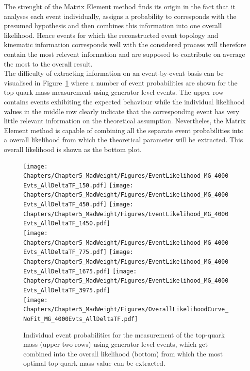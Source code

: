 The strenght of the Matrix Element method finds its origin in the fact that it analyses each event individually, assigns a probability to corresponds with the presumed hypothesis and then combines this information into one overall likelihood.
Hence events for which the reconstructed event topology and kinematic information corresponds well with the considered process will therefore contain the most relevent information and are supposed to contribute on average the most to the overall result.
\\
The difficulty of extracting information on an event-by-event basis can be visualised in Figure~\ref{fig::EvtProbsMTGen} where a number of event probabilities are shown for the top-quark mass measurement using generator-level events. The upper row contains events exhibiting the expected behaviour while the individual likelihood values in the middle row clearly indicate that the corresponding event has very little relevant information on the theoretical assumption.
Nevertheles, the Matrix Element method is capable of combining all the separate event probabilities into a overall likelihood from which the theoretical parameter will be extracted. This overall likelihood is shown as the bottom plot. %
\\
\begin{figure}[h!tb]
 \centering
 \texttt{[image: Chapters/Chapter5\_MadWeight/Figures/EventLikelihood\_MG\_4000Evts\_AllDeltaTF\_150.pdf]} \vspace{0.2cm}
 \texttt{[image: Chapters/Chapter5\_MadWeight/Figures/EventLikelihood\_MG\_4000Evts\_AllDeltaTF\_450.pdf]} \vspace{0.2cm}
 \texttt{[image: Chapters/Chapter5\_MadWeight/Figures/EventLikelihood\_MG\_4000Evts\_AllDeltaTF\_1450.pdf]} \hspace{0.1cm} \\
 \texttt{[image: Chapters/Chapter5\_MadWeight/Figures/EventLikelihood\_MG\_4000Evts\_AllDeltaTF\_775.pdf]} \vspace{0.2cm}
 \texttt{[image: Chapters/Chapter5\_MadWeight/Figures/EventLikelihood\_MG\_4000Evts\_AllDeltaTF\_1675.pdf]} \vspace{0.2cm}
 \texttt{[image: Chapters/Chapter5\_MadWeight/Figures/EventLikelihood\_MG\_4000Evts\_AllDeltaTF\_3975.pdf]} \hspace{0.1cm} \\
 \texttt{[image: Chapters/Chapter5\_MadWeight/Figures/OverallLikelihoodCurve\_NoFit\_MG\_4000Evts\_AllDeltaTF.pdf]}
 \caption{Individual event probabilities for the measurement of the top-quark mass (upper two rows) using generator-level events, which get combined into the overall likelihood (bottom) from which the most optimal top-quark mass value can be extracted.} \label{fig::EvtProbsMTGen}
\end{figure}

